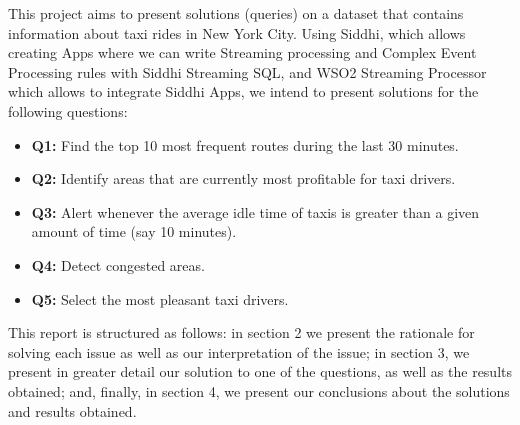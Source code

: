 This project aims to present solutions (queries) on a dataset that contains information about taxi rides in New York City. Using Siddhi, which allows creating Apps where we can write Streaming processing and Complex Event Processing rules with Siddhi Streaming SQL, and WSO2 Streaming Processor which allows to integrate Siddhi Apps, we intend to present solutions for the following questions: 

\begin{itemize}
\item \textbf{Q1:} Find the top 10 most frequent routes during the last 30 minutes. 
\item \textbf{Q2:} Identify areas that are currently most profitable for taxi drivers.
\item \textbf{Q3:} Alert whenever the average idle time of taxis is greater than a given amount of time (say 10 minutes).
\item \textbf{Q4:} Detect congested areas.
\item \textbf{Q5:} Select the most pleasant taxi drivers. 
\end{itemize}

This report is structured as follows: in section 2 we present the rationale for solving each issue as well as our interpretation of the issue; in section 3, we present in greater detail our solution to one of the questions, as well as the results obtained; and, finally, in section 4, we present our conclusions about the solutions and results obtained. 